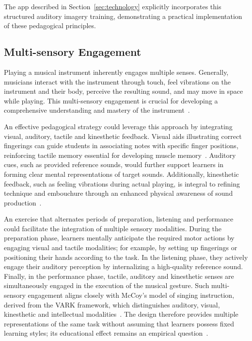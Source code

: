 \documentclass[runningheads]{llncs}
\begin{document}
The app described in Section~\ref{sec:technology} explicitly incorporates this structured auditory imagery training, demonstrating a practical implementation of these pedagogical principles.


\subsection{Multi-sensory Engagement}

Playing a musical instrument inherently engages multiple senses. Generally, musicians interact with the instrument through touch, feel vibrations on the instrument and their body, perceive the resulting sound, and may move in space while playing. This multi-sensory engagement is crucial for developing a comprehensive understanding and mastery of the instrument~\cite{Karakaş24}.

An effective pedagogical strategy could leverage this approach by integrating visual, auditory, tactile and kinesthetic feedback. Visual aids illustrating correct fingerings can guide students in associating notes with specific finger positions, reinforcing tactile memory essential for developing muscle memory~\cite{Schmidt20}. Auditory cues, such as provided reference sounds, would further support learners in forming clear mental representations of target sounds. Additionally, kinesthetic feedback, such as feeling vibrations during actual playing, is integral to refining technique and embouchure through an enhanced physical awareness of sound production~\cite{Kohut85}.

An exercise that alternates periods of preparation, listening and performance could facilitate the integration of multiple sensory modalities. During the preparation phase, learners mentally anticipate the required motor actions by engaging visual and tactile modalities; for example, by setting up fingerings or positioning their hands according to the task. In the listening phase, they actively engage their auditory perception by internalizing a high-quality reference sound. Finally, in the performance phase, tactile, auditory and kinesthetic senses are simultaneously engaged in the execution of the musical gesture. Such multi-sensory engagement aligns closely with McCoy’s model of singing instruction, derived from the VARK framework, which distinguishes auditory, visual, kinesthetic and intellectual modalities~\cite{McCoy04,Fleming92}. The design therefore provides multiple representations of the same task without assuming that learners possess fixed learning styles; its educational effect remains an empirical question~\cite{Fleming06}.
\end{document}
